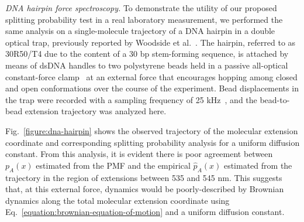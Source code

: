 \documentclass[aps,prl,twocolumn,superscriptaddress,floatfix]{revtex4-1}
\begin{document}
\noindent\emph{DNA hairpin force spectroscopy.}
To demonstrate the utility of our proposed splitting probability test in a real laboratory measurement, we performed the same analysis on a single-molecule trajectory of a DNA hairpin in a double optical trap, previously reported by Woodside et al.~\cite{woodside:science:2006:dna-hairpin-optical-trap}.
The hairpin, referred to as 30R50/T4 due to the content of a 30 bp stem-forming sequence, is attached by means of dsDNA handles to two polystyrene beads held in a passive all-optical constant-force clamp~\cite{woodside:prl:2005:optical-force-clamp} at an external force that encourages hopping among closed and open conformations over the course of the experiment.
Bead displacements in the trap were recorded with a sampling frequency of 25 kHz~\cite{woodside:science:2006:dna-hairpin-optical-trap}, and the bead-to-bead extension trajectory was analyzed here.

Fig.~\ref{figure:dna-hairpin} shows the observed trajectory of the molecular extension coordinate and corresponding splitting probability analysis
for a uniform diffusion constant.
From this analysis, it is evident there is poor agreement between $p_A(x)$ estimated from the PMF and the empirical $\hat{p}_A(x)$ estimated from the trajectory in the region of extensions between 535 and 545 nm.
This suggests that, at this external force, dynamics would be poorly-described by Brownian dynamics along the total molecular extension coordinate using Eq.~\ref{equation:brownian-equation-of-motion} and a uniform diffusion constant.
\end{document}
